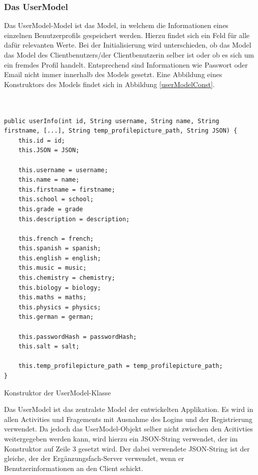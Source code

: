 \documentclass[../main.tex]{subfiles}
\begin{document}
	\subsubsection{Das UserModel}
	Das UserModel-Model ist das Model, in welchem die Informationen eines einzelnen Benutzerprofils gespeichert werden. Hierzu findet sich ein Feld für alle dafür relevanten Werte. Bei der Initialisierung wird unterschieden, ob das Model das Model des Clientbenutzers/der Clientbenutzerin selber ist oder ob es sich um ein fremdes Profil handelt. Entsprechend sind Informationen wie Passwort oder Email nicht immer innerhalb des Models gesetzt. Eine Abbildung eines Konstruktors des Models findet sich in Abbildung \ref{userModelConst}.
	
	\begin{code}
	\begin{center}
		\begin{verbatim}
		
	
public userInfo(int id, String username, String name, String firstname, [...], String temp_profilepicture_path, String JSON) {
	this.id = id;
	this.JSON = JSON;

	this.username = username;
	this.name = name;
	this.firstname = firstname;
	this.school = school;
	this.grade = grade
	this.description = description;
	
	this.french = french;
	this.spanish = spanish;
	this.english = english;
	this.music = music;
	this.chemistry = chemistry;
	this.biology = biology;
	this.maths = maths;
	this.physics = physics;
	this.german = german;
	
	this.passwordHash = passwordHash;
	this.salt = salt;

	this.temp_profilepicture_path = temp_profilepicture_path;
}
		\end{verbatim}
		\caption{Konstruktor der UserModel-Klasse}
		\label{userModelConst}
	\end{center}
	
\end{code}
	Das UserModel ist das zentralste Model der entwickelten Applikation. Es wird in allen Activities und Fragements mit Ausnahme des Logins und der Registrierung verwendet. Da jedoch das UserModel-Objekt selber nicht zwischen den Acitivties weitergegeben werden kann, wird hierzu ein JSON-String verwendet, der im Konstruktor auf Zeile 3 gesetzt wird. Der dabei verwendete JSON-String ist der gleiche, der der Ergänzungsfach-Server verwendet, wenn er Benutzerinformationen an den Client schickt.
	
\end{document}
